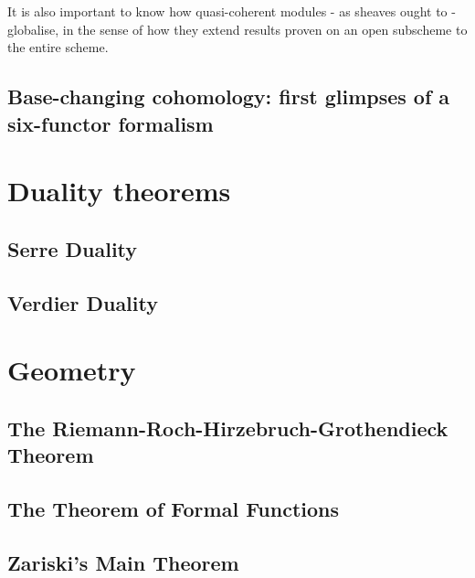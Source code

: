         It is also important to know how quasi-coherent modules - as sheaves ought to - globalise, in the sense of how they extend results proven on an open subscheme to the entire scheme.

        \subsection{Base-changing cohomology: first glimpses of a six-functor formalism}

    \section{Duality theorems}
        \subsection{Serre Duality}

        \subsection{Verdier Duality}

    \section{Geometry }
        \subsection{The Riemann-Roch-Hirzebruch-Grothendieck Theorem}
    
        \subsection{The Theorem of Formal Functions}

        \subsection{Zariski's Main Theorem}
    
    \printbibliography


